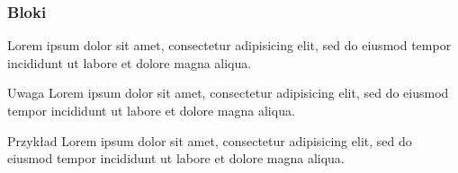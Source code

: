\documentclass{beamer}
\begin{document}
\begin{frame}
  \frametitle{Bloki}

  \begin{theorem}[Twierdzenie]
    Lorem ipsum dolor sit amet, consectetur adipisicing elit, sed do eiusmod tempor incididunt ut labore et dolore magna aliqua.
  \end{theorem}

  \begin{alertblock}{Uwaga}
    Lorem ipsum dolor sit amet, consectetur adipisicing elit, sed do eiusmod tempor incididunt ut labore et dolore magna aliqua.
  \end{alertblock}

  \begin{exampleblock}{Przykład}
    Lorem ipsum dolor sit amet, consectetur adipisicing elit, sed do eiusmod tempor incididunt ut labore et dolore magna aliqua.
  \end{exampleblock}

\end{frame}
\end{document}
